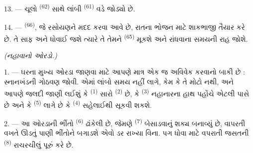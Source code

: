 13. --- ચૂલો  \textsuperscript{(62)} સાથે લાંબી
 \textsuperscript{(61)} વડે જોડ્યો છે.

14. ---  \textsuperscript{(66)}, જે રસોયણને મદદ
કરવા આવે છે, રાતના ભોજન માટે શાકભાજી તૈયાર કરે છે. તે સાફ અને ધોવાઈ
જશે ત્યારે તે તેમને  \textsuperscript{(65)} મૂકશે અને
રાંધવાના સમયની રાહ જોશે.

\VUsaut{4.0mm}
{\centering\fontsize{10.2pt}{10.2pt}\selectfont{} \textit{(નહાવાનો ઓરડો.)}\par}
\VUsaut{3.0mm}

1. --- ઘરના મુખ્ય ઓરડા જાણવા માટે આપણે માત્ર એક જ અવિવેક કરવાનો બાકી
છે : સ્નાનખંડની ગોઠવણ જોવી. એમાં લાંબો સમય નહીં લાગે, કેમ કે તે મોટો
નથી, અને આપણે જલદી જાણી લઈશું કે 
\textsuperscript{(1)} સારો  \textsuperscript{(2)} છે, કે
 \textsuperscript{(3)} નહાનારના હાથ પહોંચે એટલી પાસે
છે અને કે  \textsuperscript{(5)} લાગે છે કે
 \textsuperscript{(4)} સહેલાઈથી સૂકવી શકશે.

2. --- આ ઓરડાની ભીંતો  \textsuperscript{(6)} ઢાંકેલી
છે, જેમણે  \textsuperscript{(7)} બેસાડવાનું શક્ય બનાવ્યું
છે, વાપરતી વખતે ઊડતું પાણી ભીંતોને બગાડશે એવો ડર રાખ્યા વિના. પગ
ધોવા માટે વપરાતી જસતની  \textsuperscript{(8)}
રાચરચીલું પૂરું કરે છે.

\VUsaut{6.0mm}
\VUfilet{22mm}
